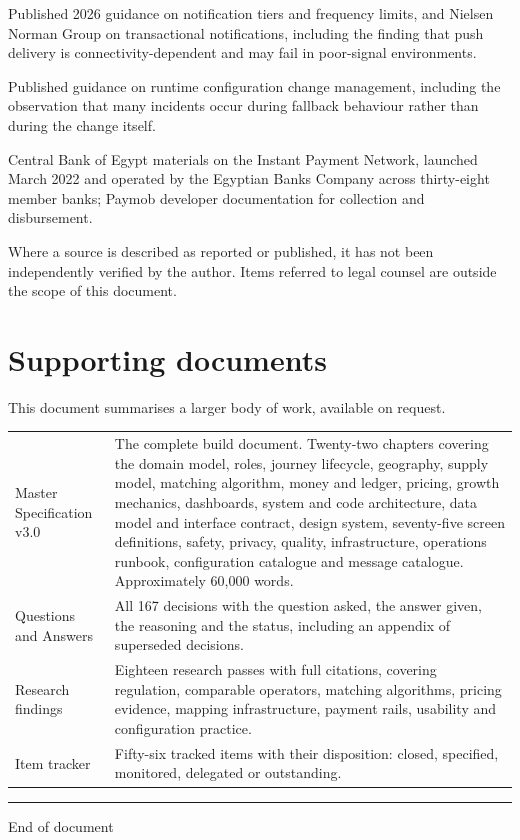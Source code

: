 \begin{description}[style=unboxed,leftmargin=0pt,itemsep=6pt]
\item[Notification practice.]
Published 2026 guidance on notification tiers and frequency limits, and Nielsen Norman Group on
transactional notifications, including the finding that push delivery is connectivity-dependent and
may fail in poor-signal environments.

\item[Runtime configuration practice.]
Published guidance on runtime configuration change management, including the observation that many
incidents occur during fallback behaviour rather than during the change itself.

\item[Payment infrastructure in Egypt.]
Central Bank of Egypt materials on the Instant Payment Network, launched March 2022 and operated by
the Egyptian Banks Company across thirty-eight member banks; Paymob developer documentation for
collection and disbursement.
\end{description}

\vspace{8pt}
\hairline
{\footnotesize\color{muted}
Where a source is described as reported or published, it has not been independently verified by the
author. Items referred to legal counsel are outside the scope of this document.\par}

\chapter{Supporting documents}

This document summarises a larger body of work, available on request.

\begin{center}
\begin{tabularx}{\textwidth}{@{}L{52mm}Y@{}}
\toprule
{} &  \\
\midrule
Master Specification v3.0 & The complete build document. Twenty-two chapters covering the domain model, roles, journey lifecycle, geography, supply model, matching algorithm, money and ledger, pricing, growth mechanics, dashboards, system and code architecture, data model and interface contract, design system, seventy-five screen definitions, safety, privacy, quality, infrastructure, operations runbook, configuration catalogue and message catalogue. Approximately 60{,}000 words. \\
Questions and Answers & All 167 decisions with the question asked, the answer given, the reasoning and the status, including an appendix of superseded decisions. \\
Research findings & Eighteen research passes with full citations, covering regulation, comparable operators, matching algorithms, pricing evidence, mapping infrastructure, payment rails, usability and configuration practice. \\
Item tracker & Fifty-six tracked items with their disposition: closed, specified, monitored, delegated or outstanding. \\
\bottomrule
\end{tabularx}
\end{center}

\vfill
\begin{center}
{\color{rule}\hrule height 0.4pt}
\vspace{5pt}
{\footnotesize\color{muted}End of document\par}
\end{center}
